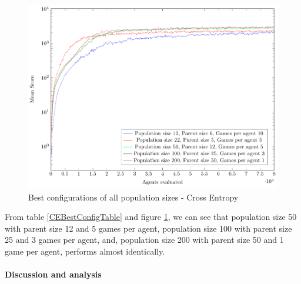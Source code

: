 \begin{figure}[H]
\centering
\includegraphics[scale=1]{data/ce_population_offspring/bestofall_population/PlotFile.pdf}
\caption{Best configurations of all population sizes - Cross Entropy \label{CEBestConfigPlot}}
\end{figure}

From table \ref{CEBestConfigTable} and figure \ref{CEBestConfigPlot}, we can see that population size 50 with parent size 12 and 5 games per agent, population size 100 with parent size 25 and 3 games per agent, and, population size 200 with parent size 50 and 1 game per agent, performs almost identically.\\\\

\textbf{Discussion and analysis}
